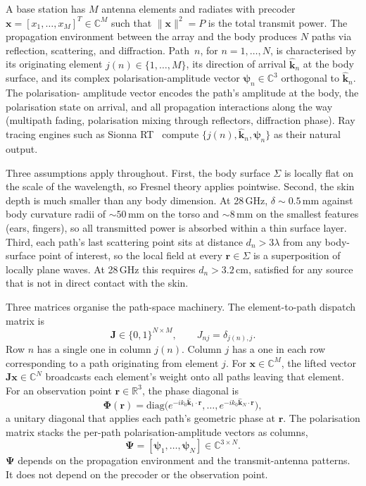 \documentclass[journal,twocolumn,10pt]{IEEEtran}
\theoremstyle{plain}
\theoremstyle{remark}
\newcommand{\khat}{\hat{\bm{k}}}
\newcommand{\rr}{\mathbf{r}}
\newcommand{\xx}{\mathbf{x}}
\newcommand{\Jmat}{\mathbf{J}}
\newcommand{\Phimat}{\mathbf{\Phi}}
\newcommand{\Psimat}{\bm{\Psi}}
\newcommand{\psin}{\bm{\psi}_n}
\newcommand{\Complex}{\mathbb{C}}
\begin{document}
A base station has $M$ antenna elements and radiates with precoder
$\xx = [x_1, \ldots, x_M]^T \in \Complex^M$ such that
$\|\xx\|^2 = P$ is the total transmit power. The propagation
environment between the array and the body produces $N$ paths via
reflection, scattering, and diffraction. Path~$n$, for
$n = 1, \ldots, N$, is characterised by its originating element
$j(n) \in \{1, \ldots, M\}$, its direction of arrival $\khat_n$ at
the body surface, and its complex polarisation-amplitude vector
$\psin \in \Complex^3$ orthogonal to $\khat_n$. The polarisation-
amplitude vector encodes the path's amplitude at the body, the
polarisation state on arrival, and all propagation interactions
along the way (multipath fading, polarisation mixing through
reflectors, diffraction phase). Ray tracing engines such as Sionna
RT~\cite{SionnaRT} compute $\{j(n), \khat_n, \psin\}$ as their
natural output.

Three assumptions apply throughout. First, the body surface $\Sigma$
is locally flat on the scale of the wavelength, so Fresnel theory
applies pointwise. Second, the skin depth is much smaller than any
body dimension. At 28\,GHz, $\delta \sim 0.5\,$mm against body
curvature radii of $\sim 50\,$mm on the torso and $\sim 8\,$mm on
the smallest features (ears, fingers), so all transmitted power is
absorbed within a thin surface layer. Third, each path's last
scattering point sits at distance $d_n > 3\lambda$ from any
body-surface point of interest, so the local field at every
$\rr \in \Sigma$ is a superposition of locally plane waves. At
28\,GHz this requires $d_n > 3.2\,$cm, satisfied for any source
that is not in direct contact with the skin.

Three matrices organise the path-space machinery. The element-to-path
dispatch matrix is
\begin{equation}\label{eq:J-def}
  \Jmat \in \{0, 1\}^{N \times M},
  \qquad
  J_{nj} = \delta_{j(n), j}.
\end{equation}
Row $n$ has a single one in column $j(n)$. Column $j$ has a one in
each row corresponding to a path originating from element $j$. For
$\xx \in \Complex^M$, the lifted vector $\Jmat \xx \in \Complex^N$
broadcasts each element's weight onto all paths leaving that element.
For an observation point $\rr \in \mathbb{R}^3$, the phase diagonal
is
\begin{equation}\label{eq:Phi-def}
  \Phimat(\rr) = \mathrm{diag}\bigl(e^{-i k_0 \khat_1 \cdot \rr},
  \ldots, e^{-i k_0 \khat_N \cdot \rr}\bigr),
\end{equation}
a unitary diagonal that applies each path's geometric phase at
$\rr$. The polarisation matrix stacks the per-path
polarisation-amplitude vectors as columns,
\begin{equation}\label{eq:Psi-def}
  \Psimat = [\bm{\psi}_1, \ldots, \bm{\psi}_N] \in \Complex^{3 \times N}.
\end{equation}
$\Psimat$ depends on the propagation environment and the
transmit-antenna patterns. It does not depend on the precoder or the
observation point.
\end{document}
